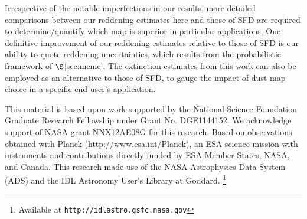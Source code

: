 \documentclass{emulateapj}
\begin{document}


Irrespective of the notable imperfections in our results, more detailed
comparisons between our reddening estimates here and those of SFD are required 
to determine/quantify which map is superior in particular applications. One 
definitive improvement of our reddening estimates relative to those of SFD is 
our ability to quote reddening uncertainties, which results from the 
probabilistic framework of $\S$\ref{sec:mcmc}. The extinction estimates 
from this work can also be employed as an alternative to those of SFD, to gauge
the impact of dust map choice in a specific end user's application.







This material is based upon work supported by the National Science Foundation 
Graduate Research Fellowship under Grant No. DGE1144152. We acknowledge support
of NASA grant NNX12AE08G for this research. Based on observations obtained with
Planck (http://www.esa.int/Planck), an ESA science mission with instruments and
contributions directly funded by ESA Member States, NASA, and Canada. This 
research made use of the NASA Astrophysics Data System (ADS) and the IDL 
Astronomy User's Library at Goddard. \footnote{Available at 
\texttt{http://idlastro.gsfc.nasa.gov}}



\end{document}
